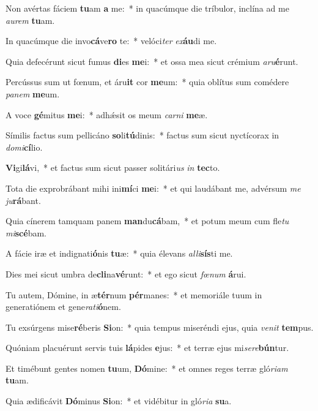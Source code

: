 \item Non avértas fáciem \textbf{tu}am \textbf{a} me:~* in quacúmque die tríbulor, inclína ad me \textit{au}\textit{rem} \textbf{tu}am.
\item In quacúmque die invo\textbf{cá}ve\textbf{ro} te:~* velóci\textit{ter} \textit{ex}\textbf{áu}di me.
\item Quia defecérunt sicut fumus \textbf{di}es \textbf{me}i:~* et ossa mea sicut crémium \textit{a}\textit{ru}\textbf{é}runt.
\item Percússus sum ut fœnum, et áru\textbf{it} cor \textbf{me}um:~* quia oblítus sum comédere \textit{pa}\textit{nem} \textbf{me}um.
\item A voce \textbf{gé}mitus \textbf{me}i:~* adhǽsit os meum \textit{car}\textit{ni} \textbf{me}æ.
\item Símilis factus sum pellicáno \textbf{so}li\textbf{tú}dinis:~* factus sum sicut nyctícorax in \textit{do}\textit{mi}\textbf{cí}lio.
\item \textbf{Vi}gi\textbf{lá}vi,~* et factus sum sicut passer solitári\textit{us} \textit{in} \textbf{tec}to.
\item Tota die exprobrábant mihi ini\textbf{mí}ci \textbf{me}i:~* et qui laudábant me, advérsum \textit{me} \textit{ju}\textbf{rá}bant.
\item Quia cínerem tamquam panem \textbf{man}du\textbf{cá}bam,~* et potum meum cum fle\textit{tu} \textit{mi}\textbf{scé}bam.
\item A fácie iræ et indignati\textbf{ó}nis \textbf{tu}æ:~* quia élevans \textit{al}\textit{li}\textbf{sís}ti me.
\item Dies mei sicut umbra de\textbf{cli}na\textbf{vé}runt:~* et ego sicut \textit{fœ}\textit{num} \textbf{á}rui.
\item Tu autem, Dómine, in æ\textbf{tér}num \textbf{pér}manes:~* et memoriále tuum in generatiónem et gene\textit{ra}\textit{ti}\textbf{ó}nem.
\item Tu exsúrgens mise\textbf{ré}beris \textbf{Si}on:~* quia tempus miseréndi ejus, quia \textit{ve}\textit{nit} \textbf{tem}pus.
\item Quóniam placuérunt servis tuis \textbf{lá}pides \textbf{e}jus:~* et terræ ejus mi\textit{se}\textit{re}\textbf{bún}tur.
\item Et timébunt gentes nomen \textbf{tu}um, \textbf{Dó}mine:~* et omnes reges terræ gló\textit{ri}\textit{am} \textbf{tu}am.
\item Quia ædificávit \textbf{Dó}minus \textbf{Si}on:~* et vidébitur in gló\textit{ri}\textit{a} \textbf{su}a.
